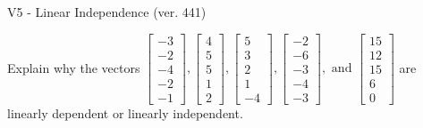 \begin{exercise}
  \begin{exerciseTitle}V5 - Linear Independence (ver. 441)\end{exerciseTitle}
  \begin{exerciseStatement}
    Explain why the vectors \(\left[\begin{array}{r}
-3 \\
-2 \\
-4 \\
-2 \\
-1
\end{array}\right] , \left[\begin{array}{r}
4 \\
5 \\
5 \\
1 \\
2
\end{array}\right] , \left[\begin{array}{r}
5 \\
3 \\
2 \\
1 \\
-4
\end{array}\right] , \left[\begin{array}{r}
-2 \\
-6 \\
-3 \\
-4 \\
-3
\end{array}\right] , \text{ and } \left[\begin{array}{r}
15 \\
12 \\
15 \\
6 \\
0
\end{array}\right]\) are linearly dependent or linearly independent.	



\end{exerciseStatement}
\end{exercise}
